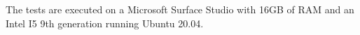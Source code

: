 \label{sub:testingAndBenchmarking}
The tests are executed on a Microsoft Surface Studio with 16GB of RAM and an Intel I5 9th generation running Ubuntu 20.04.